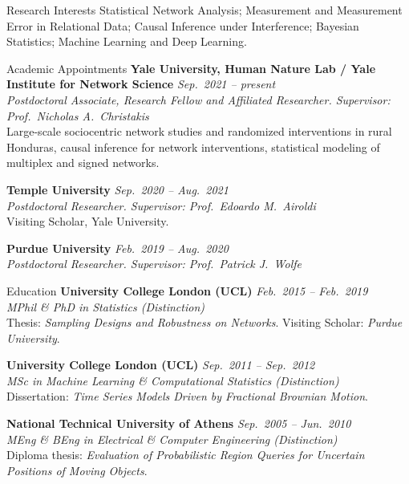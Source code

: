 \documentclass{resume}
\begin{document}
\begin{rSection}{Research Interests}
Statistical Network Analysis; Measurement and Measurement Error in Relational Data; Causal Inference under Interference; Bayesian Statistics; Machine Learning and Deep Learning.
\end{rSection}

\begin{rSection}{Academic Appointments}
{\bf Yale University, Human Nature Lab / Yale Institute for Network Science} \hfill {\em Sep.\ 2021 -- present}\\
\textit{Postdoctoral Associate, Research Fellow and Affiliated Researcher. Supervisor: Prof.\ Nicholas A.\ Christakis}\\
{\small Large-scale sociocentric network studies and randomized interventions in rural Honduras, causal inference for network interventions, statistical modeling of multiplex and signed networks.}

{\bf Temple University} \hfill {\em Sep.\ 2020 -- Aug.\ 2021}\\
\textit{Postdoctoral Researcher. Supervisor: Prof.\ Edoardo M.\ Airoldi}\\
{\small Visiting Scholar, Yale University.}

{\bf Purdue University} \hfill {\em Feb.\ 2019 -- Aug.\ 2020}\\
\textit{Postdoctoral Researcher. Supervisor: Prof.\ Patrick J.\ Wolfe}
\end{rSection}

\begin{rSection}{Education}
{\bf University College London (UCL)} \hfill {\em Feb.\ 2015 -- Feb.\ 2019}\\
\textit{MPhil \& PhD in Statistics (Distinction)}\\
Thesis: \textit{Sampling Designs and Robustness on Networks}. Visiting Scholar: \textit{Purdue University}.

{\bf University College London (UCL)} \hfill {\em Sep.\ 2011 -- Sep.\ 2012}\\
\textit{MSc in Machine Learning \& Computational Statistics (Distinction)}\\
Dissertation: \textit{Time Series Models Driven by Fractional Brownian Motion}.

{\bf National Technical University of Athens} \hfill {\em Sep.\ 2005 -- Jun.\ 2010}\\
\textit{MEng \& BEng in Electrical \& Computer Engineering (Distinction)}\\
Diploma thesis: \textit{Evaluation of Probabilistic Region Queries for Uncertain Positions of Moving Objects}.
\end{rSection}
\end{document}
